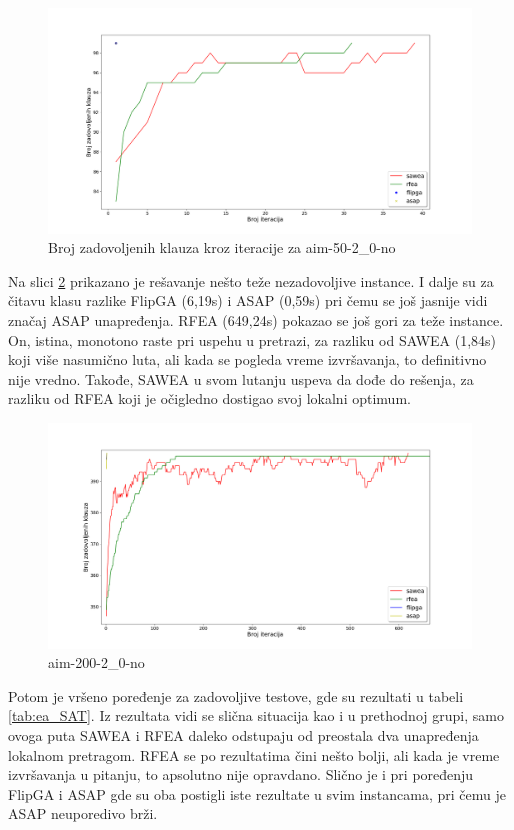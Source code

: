 \documentclass[a4paper]{article}
\begin{document}
\begin{figure}[h!]
\centering
\includegraphics[width=\textwidth]{ea-aim-50-2_0-no}
\caption{Broj zadovoljenih klauza kroz iteracije za aim-50-2\_0-no}\label{img:ea_no1}
\end{figure}

Na slici \ref{img:ea_no2} prikazano je rešavanje nešto teže nezadovoljive instance.
I dalje su za čitavu klasu razlike FlipGA (6,19s) i ASAP (0,59s) pri čemu se još jasnije 
vidi značaj ASAP unapređenja. RFEA (649,24s) pokazao se još gori za teže instance. 
On, istina, monotono raste pri uspehu u pretrazi, za razliku od SAWEA (1,84s) koji više 
nasumično luta, ali kada se pogleda vreme izvršavanja, to definitivno nije vredno.
Takođe, SAWEA u svom lutanju uspeva da dođe do rešenja, za razliku od RFEA
koji je očigledno dostigao svoj lokalni optimum.\\
 
\begin{figure}[h!]
\centering
\includegraphics[width=\textwidth]{ea-aim-200-2_0-no}
\caption{aim-200-2\_0-no}\label{img:ea_no2}
\end{figure}

Potom je vršeno poređenje za zadovoljive testove, gde su rezultati u tabeli \ref{tab:ea_SAT}.
Iz rezultata vidi se slična situacija kao i u prethodnoj grupi, samo ovoga puta 
SAWEA i RFEA daleko odstupaju od preostala dva unapređenja lokalnom pretragom.
RFEA se po rezultatima čini nešto bolji, ali kada je vreme izvršavanja u pitanju, to
apsolutno nije opravdano. Slično je i pri poređenju FlipGA i ASAP gde su oba postigli
iste rezultate u svim instancama, pri čemu je ASAP neuporedivo brži.\\
\end{document}
